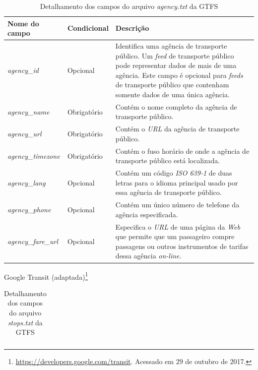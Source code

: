 \documentclass[
	12pt,				%
	oneside,			%
	a4paper,			%
	english,			%
	brazil				%
	]{abntex2ppgsi}
\begin{document}
{{{\begin{apendicesenv}
\begin{table}[!htb]
\centering
  \caption{Detalhamento dos campos do arquivo \textit{agency.txt} da GTFS}
      \label{tab:gtfsAgency}
\begin{tabular}{>{\centering\arraybackslash}m{3.5cm} | >{\centering}m{3cm} | >{\centering\arraybackslash}m{8cm}}
\hline
\textbf{Nome do campo} & \textbf{Condicional} & \textbf{Descrição} \\
\hline
\textit{agency\_id} & Opcional & Identifica uma agência de transporte público. Um \textit{feed} de transporte público pode representar dados de mais de uma agência. Este campo é opcional para \textit{feeds} de transporte público que contenham somente dados de uma única agência. \\
\hline
\textit{agency\_name} & Obrigatório & Contém o nome completo da agência de transporte público. \\
\hline
\textit{agency\_url} & Obrigatório & Contém o \textit{URL} da agência de transporte público. \\
\hline
\textit{agency\_timezone} & Obrigatório & Contém o fuso horário de onde a agência de transporte público está localizada. \\
\hline
\textit{agency\_lang} & Opcional & Contém um código \textit{ISO 639-1} de duas letras para o idioma principal usado por essa agência de transporte público. \\
\hline
\textit{agency\_phone} & Opcional & Contém um único número de telefone da agência especificada. \\
\hline
\textit{agency\_fare\_url} & Opcional & Especifica o \textit{URL} de uma página da \textit{Web} que permite que um passageiro compre passagens ou outros instrumentos de tarifas dessa agência \textit{on-line}. \\
\hline
\end{tabular}
\end{table}
\vspace{-\baselineskip}
 Google Transit (adaptada)\footnote{\label{gtfsFields}\url{https://developers.google.com/transit}. Acessado em 29 de outubro de 2017.}

\clearpage

\begin{longtable}[!htb]{>{\centering\arraybackslash}m{3.8cm} | >{\centering}m{2.5cm} | >{\centering\arraybackslash}m{8.5cm}}
  \caption{Detalhamento dos campos do arquivo \textit{stops.txt} da GTFS}
      \label{tab:gtfsStops} \\


\end{longtable}
\end{apendicesenv}}}}
\end{document}
